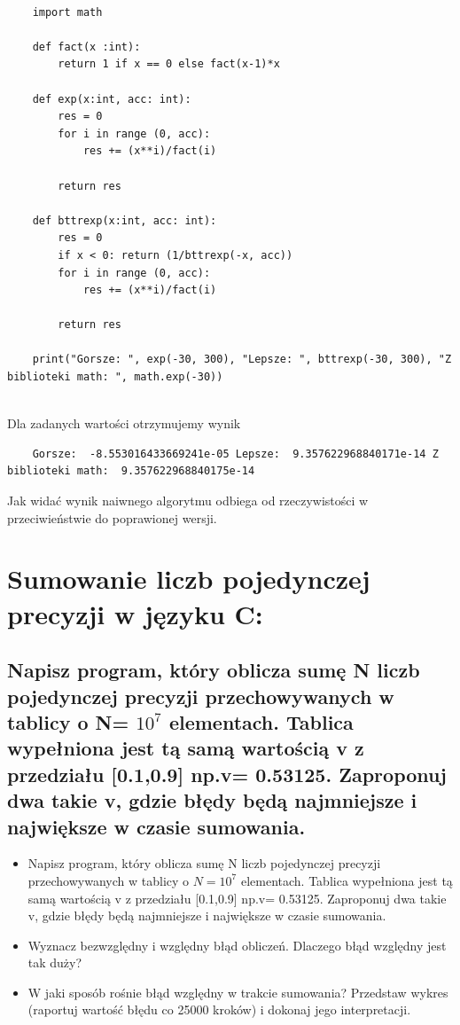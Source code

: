 \documentclass{article}
\begin{document}
\begin{verbatim}
		
	import math

	def fact(x :int):
		return 1 if x == 0 else fact(x-1)*x
	
	def exp(x:int, acc: int):
		res = 0
		for i in range (0, acc):
			res += (x**i)/fact(i)
	
		return res
	
	def bttrexp(x:int, acc: int):
		res = 0
		if x < 0: return (1/bttrexp(-x, acc))
		for i in range (0, acc):
			res += (x**i)/fact(i)
	
		return res
	
	print("Gorsze: ", exp(-30, 300), "Lepsze: ", bttrexp(-30, 300), "Z biblioteki math: ", math.exp(-30))
	
\end{verbatim}

Dla zadanych wartości otrzymujemy wynik
\begin{lstlisting}
	Gorsze:  -8.553016433669241e-05 Lepsze:  9.357622968840171e-14 Z biblioteki math:  9.357622968840175e-14
\end{lstlisting}
Jak widać wynik naiwnego algorytmu odbiega od rzeczywistości w przeciwieństwie do poprawionej wersji.

\section{Sumowanie liczb pojedynczej precyzji w języku C:
}
\subsection{Napisz program, który oblicza sumę N liczb pojedynczej precyzji przechowywanych w tablicy o N= $10^7$ elementach. Tablica wypełniona jest tą samą wartością v z przedziału [0.1,0.9] np.v= 0.53125. Zaproponuj dwa takie v, gdzie błędy będą najmniejsze i największe w czasie sumowania.}

\begin{itemize}
	\item Napisz program, który oblicza sumę N liczb pojedynczej precyzji przechowywanych w tablicy o $N= 10^7$ elementach. Tablica wypełniona jest tą samą wartością v z przedziału [0.1,0.9] np.v= 0.53125. Zaproponuj dwa takie v, gdzie błędy będą najmniejsze i największe w czasie sumowania.
	\item Wyznacz bezwzględny i względny błąd obliczeń. Dlaczego błąd względny jest tak duży?
	\item W jaki sposób rośnie błąd względny w trakcie sumowania? Przedstaw wykres (raportuj wartość błędu co 25000 kroków) i dokonaj jego interpretacji.

\end{itemize}
\end{document}
